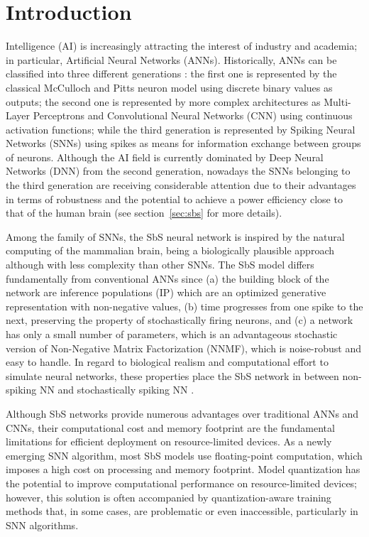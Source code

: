 
\section{Introduction}
\label{sec:introduction}
 Intelligence (AI) is increasingly attracting the interest of industry and academia; in particular,  Artificial Neural Networks (ANNs). Historically, ANNs can be classified into three different generations \cite{Design_Exploration_SbS_Trans20}: the first one is represented by the classical McCulloch and Pitts neuron model using discrete binary values as outputs; the second one is represented by more complex architectures as Multi-Layer Perceptrons and Convolutional Neural Networks (CNN) using continuous activation functions; while the third generation is represented by Spiking Neural Networks (SNNs) using spikes as means for information exchange between groups of neurons. Although the AI field is currently dominated by Deep Neural Networks (DNN) from the second generation, nowadays the SNNs belonging to the third generation are receiving considerable attention \cite{Spinnaker_Trans13,ernst2007efficient,Design_Exploration_SbS_Trans20, SNN_Survey_Trans19} due to their advantages in terms of robustness and the
potential to achieve a power efficiency close to that of the human
brain (see section~\ref{sec:sbs} for more details).

Among the family of SNNs, the SbS neural network \cite{ernst2007efficient} is inspired by the natural computing of the mammalian brain, being a biologically plausible approach although with less complexity than other SNNs. The SbS model differs fundamentally from conventional ANNs since (a) the building block of the network are inference populations (IP) which are an optimized generative representation with non-negative values, (b) time progresses from one spike to the next, preserving the property of stochastically firing neurons, and (c) a network has only a small number of parameters, which is an advantageous stochastic version of Non-Negative Matrix Factorization (NNMF), which is noise-robust and easy to handle. In regard to biological realism and computational effort to simulate neural networks, these properties place the SbS network in between non-spiking NN and stochastically spiking NN \cite{rotermund2019Backpropagation}.

Although SbS networks provide numerous advantages over traditional ANNs and CNNs, their computational cost and memory footprint are the fundamental limitations for efficient deployment on resource-limited devices. As a newly emerging SNN algorithm, most SbS models use floating-point computation, which imposes a high cost on processing and memory footprint. Model quantization has the potential to improve computational performance on resource-limited devices; however, this solution is often accompanied by quantization-aware training methods that, in some cases, are problematic or even inaccessible, particularly in SNN algorithms\cite{zhang2018survey}.

